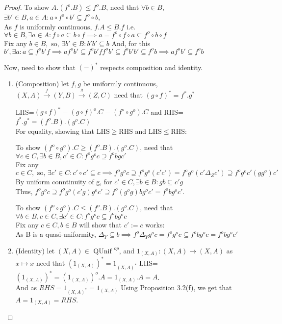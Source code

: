 \documentclass[18pt,a4paper]{article}
\theoremstyle{definition}
\begin{document}
\begin{proof}
		To show $A.(f^o .B) \leq f^o .B$, need that $\forall b \in B$,
		$\exists b' \in B, a\in A : a \circ f^o \circ b' \subseteq f^o \circ b$,\\
		As $f$ is uniformly continuous, $f.A\leq B.f$ i.e. $\forall b \in B, \exists a \in A
		: f \circ a \subseteq b \circ f
		\implies a= f^o \circ f \circ a \subseteq f^o \circ  b \circ f $   \\
		Fix any $b \in B, \text{ so, } \exists b' \in B : b'b' \subseteq b$
		And, for this $b', \exists a : a \subseteq f^ob'f \implies af^ob' \subseteq f^ob'ff^ob'
		\subseteq f^o b'b' \subseteq f^o b \implies af^ob' \subseteq f^o b$\\
	\item	Now, need to show that $(-)^*$ respects composition and identity.
		\begin{enumerate}[label=(\roman*)]
			\item (Composition) let $f,g$ be uniformly continuous,
				$(X,A) \xrightarrow{f} (Y,B) \xrightarrow{g} (Z,C)$
				need that $(g \circ f)^*= f^*.g^* $

				LHS=$(g \circ f)^*=(g \circ f)^o .C=(f^o \circ g^o).C$ and
				RHS=$f^*.g^* =(f^o .B).(g^o .C)$\\
				For equality, showing that LHS$\geq$RHS and LHS$\leq$RHS:

				To show $(f^o \circ g^o).C\geq(f^o .B).(g^o .C)$, need that
				$\forall c \in C, \exists b \in B, c' \in C : f^og^oc
				\supseteq f^obgc'$ \\
				Fix any $c \in C, \text{ so, } \exists c' \in C: c' \circ c' \subseteq c
				\implies f^o g^o c \supseteq f^o g^o (c'c')
				=f^o g^o (c' \Delta_Z c') \supseteq f^o g^o c'(gg^o)c'$ \\
				By uniform conntinuity of g, for $c'\in C,\exists b\in B: gb\subseteq c'g $
				\\Thus, $f^o g^o c \supseteq f^o g^o (c'g)g^oc' \supseteq
				f^o (g^o g)bg^o c'=f^o bg^o c'$.

				To show $(f^o \circ g^o).C\leq(f^o .B).(g^o .C)$, need that
				$\forall b \in B, c \in C, \exists c' \in C: f^o g^o c \subseteq f^obg^oc $
				\\Fix any $c\in C, b\in B$ will show that $c':=c$ works:\\
				As B is a quasi-uniformity, $\Delta_Y \subseteq b\implies f^o \Delta_Y
				g^o c=f^o g^o c \subseteq f^o b	g^o c=f^o b g^o c'$
			\item(Identity) let $(X,A)\in \text{ QUnif }^{op} $, and
				$1_{(X,A)}:(X,A)\to(X,A)$ as $x\mapsto x$ need that
				$(1_{(X,A)})^*=1_{(X,A)^*}$
				LHS=$(1_{(X,A)})^*=(1_{(X,A)})^o.A=1_{(X,A)}.A=A$. \\
				And as $RHS=1_{(X,A)^*}=1_{(X,A)}$
				Using Proposition 3.2(f), we get that $A=1_{(X,A)}=RHS$. \qedhere
		\end{enumerate}
	\end{proof}
\end{document}
